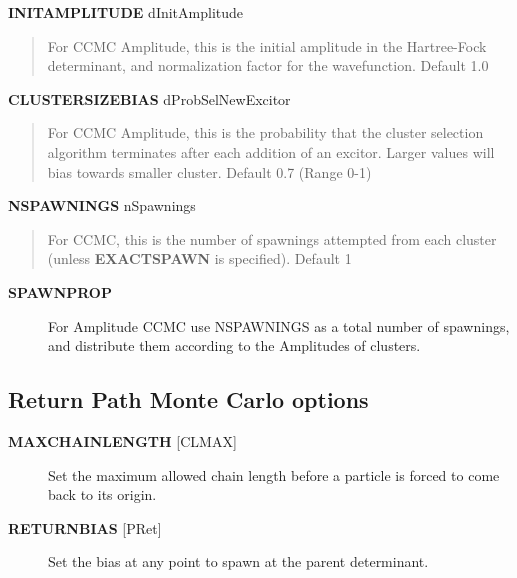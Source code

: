 \documentclass[openany,a4paper,10pt,english]{manual}
\begin{document}
\textbf{INITAMPLITUDE} dInitAmplitude
\begin{quote}

For CCMC Amplitude, this is the initial amplitude in the Hartree-Fock determinant, and normalization factor for the wavefunction.
Default 1.0
\end{quote}

\textbf{CLUSTERSIZEBIAS} dProbSelNewExcitor
\begin{quote}

For CCMC Amplitude, this is the probability that the cluster selection algorithm terminates after each addition of an excitor.
Larger values will bias towards smaller cluster.
Default 0.7 (Range 0-1)
\end{quote}

\textbf{NSPAWNINGS} nSpawnings
\begin{quote}

For CCMC, this is the number of spawnings attempted from each cluster (unless \textbf{EXACTSPAWN} is specified).  Default 1
\end{quote}
\begin{description}
\item[\textbf{SPAWNPROP}] \leavevmode
For Amplitude CCMC use NSPAWNINGS as a total number of spawnings, and distribute them according to the Amplitudes of clusters.

\end{description}


\subsection{Return Path Monte Carlo options}
\begin{description}
\item[\textbf{MAXCHAINLENGTH} {[}CLMAX{]}] \leavevmode
Set the maximum allowed chain length before a particle is forced to
come back to its origin.

\item[\textbf{RETURNBIAS} {[}PRet{]}] \leavevmode
Set the bias at any point to spawn at the parent determinant.

\end{description}
\end{document}
